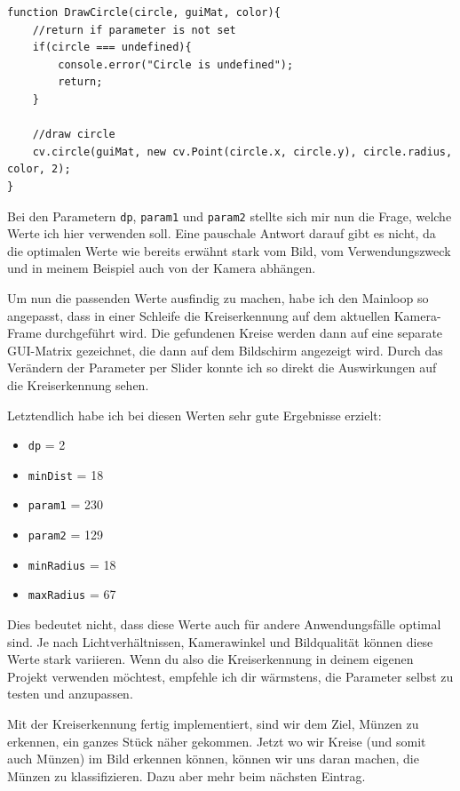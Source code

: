 \begin{lstlisting}[style=JavaScript]
function DrawCircle(circle, guiMat, color){
    //return if parameter is not set
    if(circle === undefined){
        console.error("Circle is undefined");
        return;
    }

    //draw circle
    cv.circle(guiMat, new cv.Point(circle.x, circle.y), circle.radius, color, 2);
}
\end{lstlisting}

Bei den Parametern \texttt{dp}, \texttt{param1} und \texttt{param2} stellte sich mir nun die Frage, welche Werte ich hier verwenden soll. Eine pauschale Antwort darauf gibt es nicht, da die optimalen Werte wie bereits erwähnt stark vom Bild, vom Verwendungszweck und in meinem Beispiel auch von der Kamera abhängen.

Um nun die passenden Werte ausfindig zu machen, habe ich den Mainloop so angepasst, dass in einer Schleife die Kreiserkennung auf dem aktuellen Kamera-Frame durchgeführt wird. Die gefundenen Kreise werden dann auf eine separate \glqq GUI-Matrix\grqq{} gezeichnet, die dann auf dem Bildschirm angezeigt wird. Durch das Verändern der Parameter per Slider konnte ich so direkt die Auswirkungen auf die Kreiserkennung sehen.

Letztendlich habe ich bei diesen Werten sehr gute Ergebnisse erzielt:
\begin{itemize}
    \item \texttt{dp} = 2
    \item \texttt{minDist} = 18
    \item \texttt{param1} = 230
    \item \texttt{param2} = 129
    \item \texttt{minRadius} = 18
    \item \texttt{maxRadius} = 67
\end{itemize}

Dies bedeutet nicht, dass diese Werte auch für andere Anwendungsfälle optimal sind. Je nach Lichtverhältnissen, Kamerawinkel und Bildqualität können diese Werte stark variieren. Wenn du also die Kreiserkennung in deinem eigenen Projekt verwenden möchtest, empfehle ich dir wärmstens, die Parameter selbst zu testen und anzupassen.

Mit der Kreiserkennung fertig implementiert, sind wir dem Ziel, Münzen zu erkennen, ein ganzes Stück näher gekommen. Jetzt wo wir Kreise (und somit auch Münzen) im Bild erkennen können, können wir uns daran machen, die Münzen zu klassifizieren. Dazu aber mehr beim nächsten Eintrag.